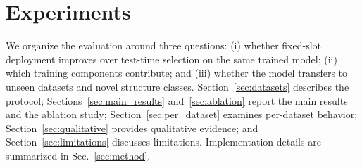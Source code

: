\section{Experiments}
\label{sec:experiments}

We organize the evaluation around three questions: (i) whether fixed-slot
deployment improves over test-time selection on the same trained model;
(ii) which training components contribute; and (iii) whether the model
transfers to unseen datasets and novel structure classes.
Section~\ref{sec:datasets} describes the protocol;
Sections~\ref{sec:main_results} and~\ref{sec:ablation} report the main
results and the ablation study; Section~\ref{sec:per_dataset} examines
per-dataset behavior; Section~\ref{sec:qualitative} provides qualitative
evidence; and Section~\ref{sec:limitations} discusses limitations.
Implementation details are summarized in Sec.~\ref{sec:method}.

